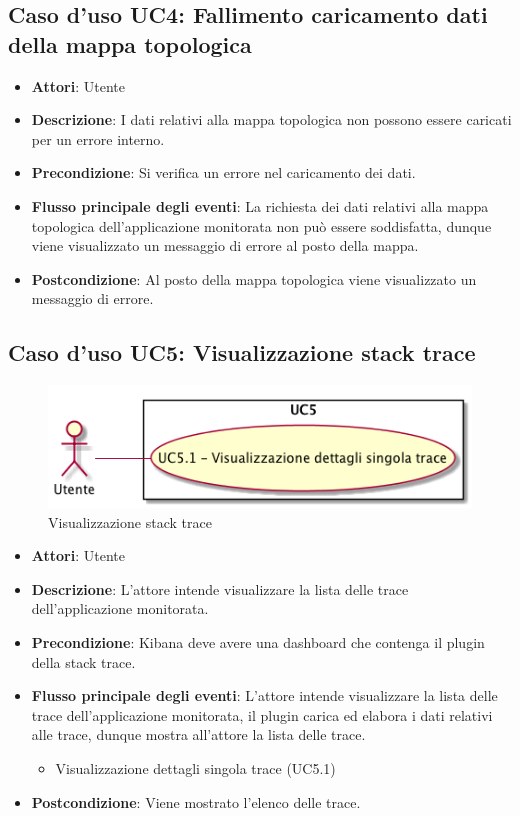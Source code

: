 \subsection{Caso d'uso UC4: Fallimento caricamento dati della mappa topologica}
\begin{itemize}
	\item \textbf{Attori}: Utente
	\item \textbf{Descrizione}: I dati relativi alla mappa topologica non possono essere caricati per un errore interno.
	
	\item \textbf{Precondizione}: Si verifica un errore nel caricamento dei dati.
	\item \textbf{Flusso principale degli eventi}: La richiesta dei dati relativi alla mappa topologica dell'applicazione monitorata non può essere soddisfatta, dunque viene visualizzato un messaggio di errore al posto della mappa.
	\item \textbf{Postcondizione}: Al posto della mappa topologica viene visualizzato un messaggio di errore.
\end{itemize}
\subsection{Caso d'uso UC5: Visualizzazione stack trace}
\begin{figure} [H]
	\centering
	\includegraphics[scale=0.45]{./UC/UC5.png}
	\caption{Visualizzazione stack trace}\label{}
\end{figure}
\begin{itemize}
	\item \textbf{Attori}: Utente
	\item \textbf{Descrizione}: L'attore intende visualizzare la lista delle trace dell'applicazione monitorata.
	\item \textbf{Precondizione}: Kibana deve avere una dashboard che contenga il plugin della stack trace.
	\item \textbf{Flusso principale degli eventi}: L'attore intende visualizzare la lista delle trace dell'applicazione monitorata, il plugin carica ed elabora i dati relativi alle trace, dunque mostra all'attore la lista delle trace.
	\begin{itemize}
		\item Visualizzazione dettagli singola trace (UC5.1)
	\end{itemize}
	\item \textbf{Postcondizione}: Viene mostrato l'elenco delle trace.
\end{itemize}
